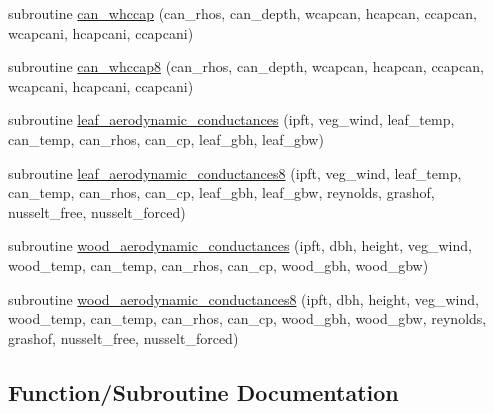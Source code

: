 \begin{DoxyCompactItemize}
subroutine \hyperlink{namespacecanopy__struct__dynamics_a22db7ca326d1421e76c858aa60687950}{can\+\_\+whccap} (can\+\_\+rhos, can\+\_\+depth, wcapcan, hcapcan, ccapcan, wcapcani, hcapcani, ccapcani)
\item 
subroutine \hyperlink{namespacecanopy__struct__dynamics_a006df1e2d1da5f482047ab4e18c561ef}{can\+\_\+whccap8} (can\+\_\+rhos, can\+\_\+depth, wcapcan, hcapcan, ccapcan, wcapcani, hcapcani, ccapcani)
\item 
subroutine \hyperlink{namespacecanopy__struct__dynamics_a301aac44c95414a23d8abe3b5826201f}{leaf\+\_\+aerodynamic\+\_\+conductances} (ipft, veg\+\_\+wind, leaf\+\_\+temp, can\+\_\+temp, can\+\_\+rhos, can\+\_\+cp, leaf\+\_\+gbh, leaf\+\_\+gbw)
\item 
subroutine \hyperlink{namespacecanopy__struct__dynamics_a603f1234645bf9624c578131440e8555}{leaf\+\_\+aerodynamic\+\_\+conductances8} (ipft, veg\+\_\+wind, leaf\+\_\+temp, can\+\_\+temp, can\+\_\+rhos, can\+\_\+cp, leaf\+\_\+gbh, leaf\+\_\+gbw, reynolds, grashof, nusselt\+\_\+free, nusselt\+\_\+forced)
\item 
subroutine \hyperlink{namespacecanopy__struct__dynamics_ada33113f2dc56fb4576d2a52d2a573b0}{wood\+\_\+aerodynamic\+\_\+conductances} (ipft, dbh, height, veg\+\_\+wind, wood\+\_\+temp, can\+\_\+temp, can\+\_\+rhos, can\+\_\+cp, wood\+\_\+gbh, wood\+\_\+gbw)
\item 
subroutine \hyperlink{namespacecanopy__struct__dynamics_a0c4e4737235809c386a5b5cab02086f1}{wood\+\_\+aerodynamic\+\_\+conductances8} (ipft, dbh, height, veg\+\_\+wind, wood\+\_\+temp, can\+\_\+temp, can\+\_\+rhos, can\+\_\+cp, wood\+\_\+gbh, wood\+\_\+gbw, reynolds, grashof, nusselt\+\_\+free, nusselt\+\_\+forced)
\end{DoxyCompactItemize}


\subsection{Function/\+Subroutine Documentation}
\mbox{\label{namespacecanopy__struct__dynamics_a22db7ca326d1421e76c858aa60687950}} 
